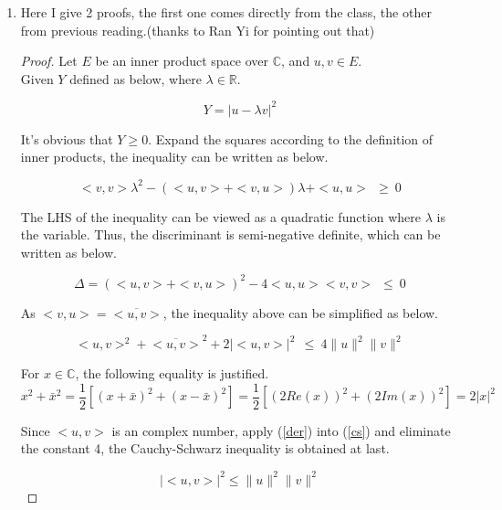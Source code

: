 \documentclass[paper=a4, fontsize=11pt]{scrartcl} %
\numberwithin{equation}{section} %
\numberwithin{figure}{section} %
\numberwithin{table}{section} %
\begin{document}
\begin{enumerate}
	\item
		Here I give 2 proofs, the first one comes directly from the class, the other from previous reading.(thanks to Ran Yi for pointing out that)
		
		\begin{proof}
			Let $E$ be an inner product space over $\mathbb{C}$, and $u, v\in E$.\\
			Given $Y$ defined as below, where $\lambda \in \mathbb{R}$.
						
			\begin{equation}
				Y = {\vert u-\lambda v \vert}^2
			\end{equation}
			
			It's obvious that $Y\geq0$. Expand the squares according to the definition of inner products, the inequality can be written as below.
			
			\begin{equation}
				<v, v>\lambda^2 -(<u, v>+<v, u>)\lambda + <u, u> \ \ \geq \ 0
			\end{equation}
			
			The LHS of the inequality can be viewed as a quadratic function where $\lambda$ is the variable. Thus, the discriminant is semi-negative definite, which can be written as below.
			
			\begin{equation}
				\Delta = (<u, v>+<v, u>)^2 - 4<u,u><v,v> \ \ \leq \ 0
			\end{equation}
			
			As $<v, u> = \overline{<u, v>}$, the inequality above can be simplified as below.
			
			\begin{equation}
				<u, v>^2 + {\overline{<u, v>}}^2 + 2{\vert <u,v> \vert}^2 \ \ \leq \ 4 \lVert u \rVert^2 \lVert v \rVert^2 \label{cs}			
			\end{equation}
			
			For $x \in \mathbb{C}$, the following equality is justified.
			\begin{equation}
				x^2 + \bar{x}^2 = \frac{1}{2}[(x+\bar{x})^2+(x-\bar{x})^2] = \frac{1}{2}[(2Re(x))^2+(2Im(x))^2] = 2 {\vert x \vert}^2 \label{der}
			\end{equation}
			
			Since $<u, v>$ is an complex number, apply (\ref{der}) into (\ref{cs}) and eliminate the constant 4, the Cauchy-Schwarz inequality is obtained at last.
			
			\begin{equation}
				{\vert <u,v> \vert}^2 \leq \lVert u \rVert^2 \lVert v \rVert^2
			\end{equation}
		\end{proof}
	

\end{enumerate}
\end{document}

